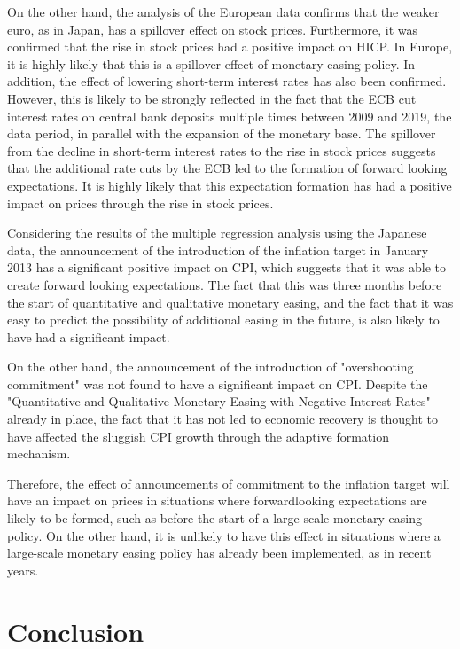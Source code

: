 \documentclass[12pt]{article}
\begin{document}
On the other hand, the analysis of the European data confirms that the weaker euro, as in Japan, has a spillover effect on stock prices.
Furthermore, it was confirmed that the rise in stock prices had a positive impact on HICP.
In Europe, it is highly likely that this is a spillover effect of monetary easing policy.
In addition, the effect of lowering short-term interest rates has also been confirmed.
However, this is likely to be strongly reflected in the fact that the ECB cut interest rates on central bank deposits multiple times between 2009 and 2019, the data period, in parallel with the expansion of the monetary base.
The spillover from the decline in short-term interest rates to the rise in stock prices suggests that the additional rate cuts by the ECB led to the formation of forward looking expectations.
It is highly likely that this expectation formation has had a positive impact on prices through the rise in stock prices.

Considering the results of the multiple regression analysis using the Japanese data, the announcement of the introduction of the inflation target in January 2013 has a significant positive impact on CPI, which suggests that it was able to create forward looking expectations.
The fact that this was three months before the start of quantitative and qualitative monetary easing, and the fact that it was easy to predict the possibility of additional easing in the future, is also likely to have had a significant impact.

On the other hand, the announcement of the introduction of "overshooting commitment" was not found to have a significant impact on CPI.
Despite the "Quantitative and Qualitative Monetary Easing with Negative Interest Rates" already in place, the fact that it has not led to economic recovery is thought to have affected the sluggish CPI growth through the adaptive formation mechanism.

Therefore, the effect of announcements of commitment to the inflation target will have an impact on prices in situations where forwardlooking expectations are likely to be formed, such as before the start of a large-scale monetary easing policy.
On the other hand, it is unlikely to have this effect in situations where a large-scale monetary easing policy has already been implemented, as in recent years.

\newpage

\section{Conclusion}
\end{document}
